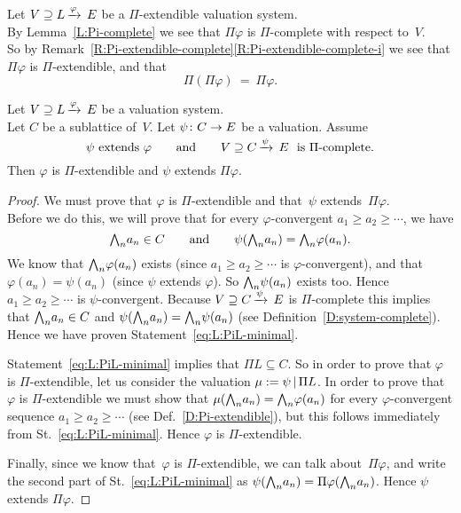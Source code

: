 \documentclass[main.tex]{subfiles}
\begin{document}
%
%
\begin{rem}
\label{R:PiPiisPi}
Let $V \supseteq L\,\smash{\xrightarrow{\varphi}\,E}$ be a $\Pi$-extendible valuation system.\\
By Lemma~\ref{L:Pi-complete}
we see that $\Pi\varphi$
is $\Pi$-complete with respect to~$V$.\\
So by
Remark~\ref{R:Pi-extendible-complete}\ref{R:Pi-extendible-complete-i}
we see that $\Pi\varphi$
is $\Pi$-extendible, and that
\begin{equation*}
\Pi(\Pi\varphi) \ =\  \Pi\varphi.
\end{equation*}
\end{rem}
%
%
\begin{lem}
\label{L:Pi-minimal}
Let $V \supseteq L\,\smash{\xrightarrow{\varphi}\,E}$ be a valuation system.\\
Let $C$ be a sublattice of~$V$.
Let $\psi\colon C\rightarrow E$ be a valuation.
Assume
\begin{equation*}
\psi\text{ extends }\varphi
\qquad\text{and}\qquad
V \supseteq C\,\smash{\xrightarrow{\psi}\,E}\ \text{ is $\Pi$-complete.}
\end{equation*}
Then $\varphi$ is $\Pi$-extendible and
$\psi$ extends $\Pi\varphi$.
\end{lem}
\begin{proof}
We must prove that $\varphi$
is $\Pi$-extendible
and that~$\psi$ extends~$\Pi\varphi$.\\
Before we do this,
we will prove that
for every $\varphi$-convergent $a_1 \geq a_2 \geq \dotsb$,
we have
\begin{equation}
\label{eq:L:PiL-minimal}
\textstyle{\bigwedge}_n a_n \in C\qquad\text{and}\qquad \psi (\textstyle{\bigwedge}_n a_n) = \textstyle{\bigwedge}_n \varphi(a_n).
\end{equation}
We know that $\textstyle{\bigwedge}_n \varphi (a_n)$ exists
(since $a_1 \geq a_2 \geq \dotsb$ is $\varphi$-convergent),
and that $\varphi(a_n)= \psi(a_n)$
(since $\psi$ extends $\varphi$).
So $\textstyle{\bigwedge}_n \psi(a_n)$ exists too.
Hence $a_1 \geq a_2 \geq \dotsb$ is $\psi$-convergent.
Because $V \supseteq C\,\smash{\xrightarrow{\psi}\,E}$ is $\Pi$-complete
this implies that $\textstyle{\bigwedge}_n a_n \in C$ and 
$\psi (\textstyle{\bigwedge}_n a_n) = \textstyle{\bigwedge}_n \psi(a_n)$
(see Definition~\ref{D:system-complete}).
Hence we have proven Statement~\eqref{eq:L:PiL-minimal}.

Statement~\eqref{eq:L:PiL-minimal} implies that $\Pi L \subseteq C$.
So in order to prove that $\varphi$
is $\Pi$-extendible,
let us consider the valuation $\mu := \psi \,|\,\Pi L$.
In order to prove that~$\varphi$
is $\Pi$-extendible
we must show that
$\mu(\textstyle{\bigwedge}_n a_n) = \textstyle{\bigwedge}_n \varphi(a_n)$
for every $\varphi$-convergent sequence $a_1 \geq a_2 \geq \dotsb$
(see Def.~\ref{D:Pi-extendible}),
but this follows immediately from St.~\eqref{eq:L:PiL-minimal}.
Hence $\varphi$ is $\Pi$-extendible.

Finally,
since we know that~$\varphi$ is $\Pi$-extendible,
we can talk about~$\Pi\varphi$,
and write the second part of
St.~\eqref{eq:L:PiL-minimal}
as $\psi(\textstyle{\bigwedge}_n a_n) = \Pi \varphi(\textstyle{\bigwedge}_n a_n)$.
Hence $\psi$ extends $\Pi\varphi$.
\end{proof}
\end{document}
